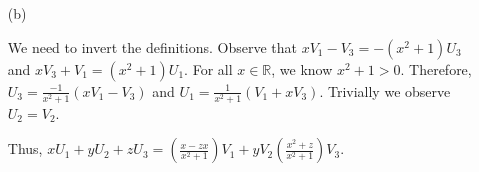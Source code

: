 \documentclass[12pt]{article}
\def\R{{\mathbb R}}        %
\numberwithin{theorem}{section}
\numberwithin{equation}{section}
\numberwithin{remark}{section}
\numberwithin{definition}{section}
\numberwithin{theorem}{section}
\numberwithin{lemma}{section}
\numberwithin{example}{section}
\begin{document}
\begin{enumerate}
{\begin{enumerate}
{			\qquad If this ``identically 0" business is confusing to you, then recall from the problem we must have $0$ at \emph{every} point $\textbf{p}$ so take $\textbf{p}=(1,0,0)$. Then the vector field at that point is $(c_1+c_3)U_1(\textbf{p})+c_2U_2+(c_3-c_1)U_3(\textbf{p})$. For this to be zero we need to solve $c_1+c_3=0$, $c_2=0$, and $c_3-c_1=0$. The solution is clearly $c_1=c_2=c_3=0$.}
			\item[(b)]{We need to invert the definitions. Observe that $xV_1-V_3=-(x^2+1)U_3$ and $xV_3+V_1=(x^2+1)U_1$. For all $x\in\R$, we know $x^2+1 > 0$. Therefore, $U_3=\frac{-1}{x^2+1}(xV_1-V_3)$ and $U_1=\frac{1}{x^2+1}(V_1+xV_3)$. Trivially we observe $U_2=V_2$.
			
			\qquad Thus, $xU_1+yU_2+zU_3=\left(\frac{x-zx}{x^2+1}\right)V_1+yV_2\left(\frac{x^2+z}{x^2+1}\right)V_3$.
		}
		\end{enumerate}
	}
\end{enumerate}
\end{document}

